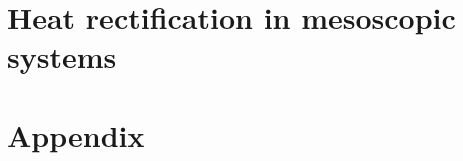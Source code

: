 \documentclass[a4paper, 12pt, twoside, openright]{Thesis}  %
\begin{document}
\part{Heat rectification in mesoscopic systems}



\appendix %
\part*{Appendix}














\backmatter
\pagestyle{empty}  %

\label{Bibliography}
\end{document}
